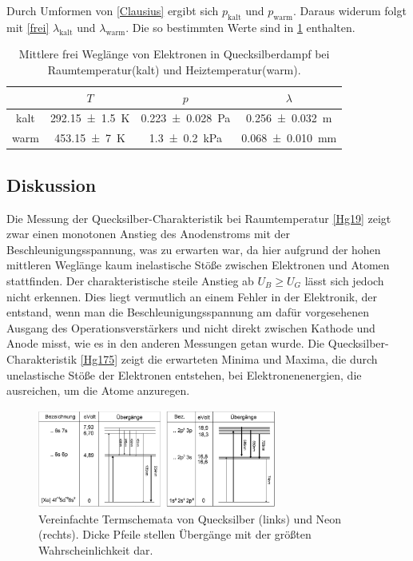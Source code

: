 \documentclass[
	a4paper,
	12pt,
	pagesize,
	ngerman
]{scrartcl}
\begin{document}
	Durch Umformen von \cref{Clausius} ergibt sich $p_\text{kalt}$ und $p_\text{warm}$.
	Daraus widerum folgt mit \cref{frei} $\lambda_\text{kalt}$ und $\lambda_\text{warm}$.
	Die so bestimmten Werte sind in \cref{TabelleFrei} enthalten.
	
	\begin{table}[H]
		\centering
		\begin{tabular}{ c | c | c | c }
			&$T$ & $p$ &  $\lambda$ \\ \hline
			kalt&\SI{292.15 +- 1,5}{K} &\SI{0,223+-0,028}{Pa} &  \SI{0,256+- 0,032}{m} \\
			warm&\SI{453.15+- 7}{K} & \SI{1,3+-0,2}{kPa} & \SI{0,068 +- 0,010}{mm} \\
		\end{tabular}
		\caption{Mittlere frei Weglänge von Elektronen in Quecksilberdampf bei Raumtemperatur(kalt) und Heiztemperatur(warm).}
		\label{TabelleFrei} 
	\end{table}
	
	
	
	\subsection{Diskussion}
	Die Messung der Quecksilber-Charakteristik bei Raumtemperatur \cref{Hg19} zeigt zwar einen monotonen Anstieg des Anodenstroms mit der Beschleunigungsspannung, was zu erwarten war, da hier aufgrund der hohen mittleren Weglänge kaum inelastische Stöße zwischen Elektronen und Atomen stattfinden. %
	Der charakteristische steile Anstieg ab $U_B \geq U_G$ lässt sich jedoch nicht erkennen.
	Dies liegt vermutlich an einem Fehler in der Elektronik, der entstand, wenn man die Beschleunigungsspannung am dafür vorgesehenen Ausgang des Operationsverstärkers und nicht direkt zwischen Kathode und Anode misst, wie es in den anderen Messungen getan wurde.
	\newline
	Die Quecksilber-Charakteristik \cref{Hg175} zeigt die erwarteten Minima und Maxima, die durch unelastische Stöße der Elektronen entstehen, bei Elektronenenergien, die ausreichen, um die Atome anzuregen.
	
	\begin{figure}[H]
		\includegraphics[width=0.7\textwidth]{Term}
		\centering
		\caption{Vereinfachte Termschemata von Quecksilber (links) und Neon
			(rechts). Dicke Pfeile stellen Übergänge mit der größten Wahrscheinlichkeit
			dar.\cite{Roehren} }
		\label{Term}
		\centering
	\end{figure}
	
\end{document}
